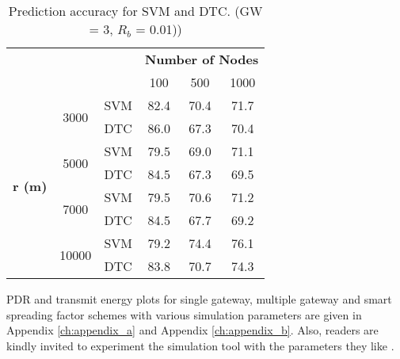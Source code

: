 \begin{table}[h]
\centering
\caption{Prediction accuracy for SVM and DTC. (GW = 3, ${R_{b}}$ = 0.01))}
\label{table:prediction_accuracy}
\begin{tabular}{|c|c|c|c|c|c|}
\hline
\multicolumn{3}{|c|}{\multirow{2}{*}{}}                        & \multicolumn{3}{c|}{\textbf{Number of Nodes}} \\ \cline{4-6}
\multicolumn{3}{|c|}{}                                         & 100           & 500           & 1000          \\ \hline
\multirow{8}{*}{\textbf{r (m)}} & \multirow{2}{*}{3000}  & SVM & 82.4          & 70.4          & 71.7          \\ \cline{3-6}
                                &                        & DTC & 86.0          & 67.3          & 70.4          \\ \cline{2-6}

                                & \multirow{2}{*}{5000}  & SVM & 79.5          & 69.0          & 71.1          \\ \cline{3-6}
                                &                        & DTC & 84.5          & 67.3          & 69.5          \\ \cline{2-6}

                                & \multirow{2}{*}{7000}  & SVM & 79.5          & 70.6          & 71.2          \\ \cline{3-6}
                                &                        & DTC & 84.5          & 67.7          & 69.2          \\ \cline{2-6}

                                & \multirow{2}{*}{10000} & SVM & 79.2          & 74.4          & 76.1          \\ \cline{3-6}
                                &                        & DTC & 83.8          & 70.7          & 74.3          \\ \hline
\end{tabular}
\end{table}

PDR and transmit energy plots for single gateway, multiple gateway and smart spreading factor schemes with various simulation parameters are given in Appendix \ref{ch:appendix_a} and Appendix \ref{ch:appendix_b}. Also, readers are kindly invited to experiment the simulation tool with the parameters they like \cite{tugrul_yatagan_simlorasf}.
